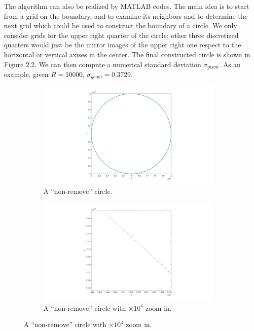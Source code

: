 \documentclass[letterpaper]{article}
\numberwithin{equation}{section} %
\numberwithin{figure}{section} %
\numberwithin{table}{section} %
\begin{document}
The algorithm can also be realized by MATLAB codes. The main idea is to start from a grid on the boundary, and to examine its neighbors and to determine the next grid which could be used to construct the boundary of a circle. We only consider grids for the upper right quarter of the circle; other three discretized quarters would just be the mirror images of the upper right one respect to the horizontal or vertical axises in the center. The final constructed circle is shown in Figure 2.2. We can then compute a numerical standard deviation $\sigma_{geom}$. As an example, given $R=10000$, $\sigma_{geom}=0.3729$.

\begin{figure}[htbp]
	\centering
	\begin{subfigure}[b]{0.4\textwidth}
		\includegraphics[width=\textwidth]{NonrmvCircle}
		\caption{A \enquote{non-remove} circle.}
		\label{NonrmvCircle}
	\end{subfigure}
	\begin{subfigure}[b]{0.4\textwidth}
		\includegraphics[width=\textwidth]{NonrmvCircleZI}
		\caption{A \enquote{non-remove} circle with $\times 10^4$ zoom in.}
		\label{NonrmvCircleZI}
	\end{subfigure}
	

\end{figure}
\end{document}
